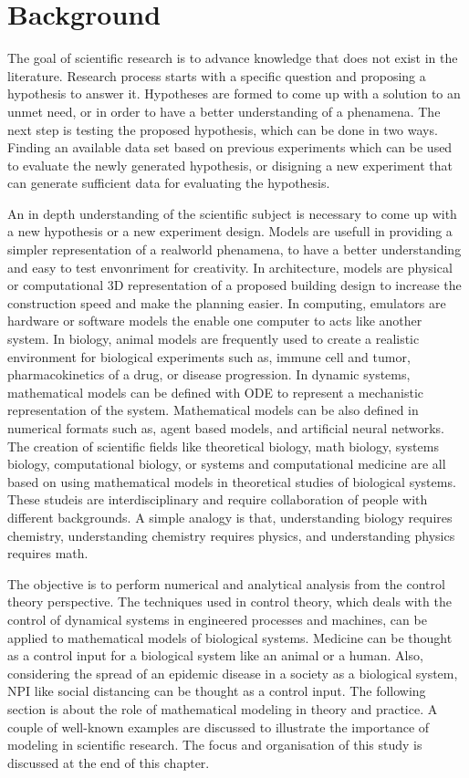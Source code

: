 \chapter{Background}
\label{chap:intro}

The goal of scientific research is to advance knowledge that does not exist in the literature.
Research process starts with a specific question and proposing a hypothesis to answer it. 
Hypotheses are formed to come up with a solution to an unmet need, or in order to have a better understanding of a phenamena.
The next step is testing the proposed hypothesis, which can be done in two ways.
Finding an available data set based on previous experiments which can be used to evaluate the newly generated hypothesis, 
or disigning a new experiment that can generate sufficient data for evaluating the hypothesis.

An in depth understanding of the scientific subject is necessary to come up with a new hypothesis or a new experiment design.
Models are usefull in providing a simpler representation of a realworld phenamena, to have a better understanding and easy to test envonriment for creativity.
In architecture, models are physical or computational 3D representation of a proposed building design to increase the construction speed and make the planning easier. 
In computing, emulators are hardware or software models the enable one computer to acts like another system. 
In biology, animal models are frequently used to create a realistic environment for biological experiments such as, immune cell and tumor, pharmacokinetics of a drug, or disease progression. 
In dynamic systems, mathematical models can be defined with \ac{ODE} to represent a mechanistic representation of the system.
Mathematical models can be also defined in numerical formats such as, agent based models, and artificial neural networks.
The creation of scientific fields like theoretical biology, math biology, systems biology, computational biology, or systems and computational medicine are all based on using mathematical models in theoretical studies of biological systems.
These studeis are interdisciplinary and require collaboration of people with different backgrounds.
A simple analogy is that, understanding biology requires chemistry, understanding chemistry requires physics, and understanding physics requires math.

The objective is to perform numerical and analytical analysis from the control theory perspective.
The techniques used in control theory, which deals with the control of dynamical systems in engineered processes and machines, can be applied to mathematical models of biological systems.
Medicine can be thought as a control input for a biological system like an animal or a human. 
Also, considering the spread of an epidemic disease in a society as a biological system, \ac{NPI} like social distancing can be thought as a control input.
The following section is  about the role of mathematical modeling in theory and practice.
A couple of well-known examples are discussed to illustrate the importance of modeling in scientific research.
The focus and organisation of this study is discussed at the end of this chapter.

